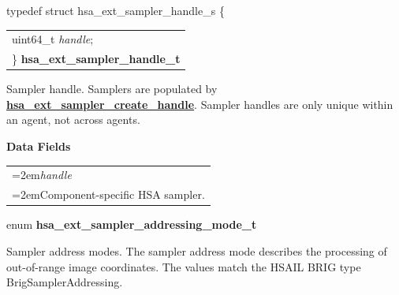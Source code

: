 \documentclass[final]{book}
\newcommand{\reffun}[1]{\textbf{#1}}
\newcommand{\reffld}[1]{\textit{#1}}
\begin{document}
\noindent\begin{tcolorbox}[breakable,nobeforeafter,arc=0mm,colframe=white,colback=lightgray,left=0mm]
typedef struct  hsa_ext_sampler_handle_s \{
\vspace{-3.5mm}\begin{longtable}{@{}p{\textwidth}}
\hspace{1.7em}uint64_t \reffld{handle};\\
\}  \hypertarget{group__images_1gaecb49fbe45d4fdb66c93fc82936cbc71}{\textbf{hsa_ext_sampler_handle_t}}
\end{longtable}

\end{tcolorbox}
Sampler handle. Samplers are populated by \hyperlink{group__images_1gad7b12bd999916b5799406ce58aa86dab}{\reffun{hsa_ext_sampler_create_handle}}. Sampler handles are only unique within an agent, not across agents.

\noindent\textbf{Data Fields}\\[-6mm]
\begin{longtable}{@{}>{\hangindent=2em}p{\textwidth}}
\reffld{handle}\\\hspace{2em}Component-specific HSA sampler.
\end{longtable}



\noindent\begin{tcolorbox}[breakable,nobeforeafter,arc=0mm,colframe=white,colback=lightgray,left=0mm]
enum \hypertarget{group__images_1ga60a9fcdc1a1f338bd7e54445359fdf0f}{\textbf{hsa_ext_sampler_addressing_mode_t}}
\end{tcolorbox}
Sampler address modes. The sampler address mode describes the processing of out-of-range image coordinates. The values match the HSAIL BRIG type BrigSamplerAddressing.
\end{document}
